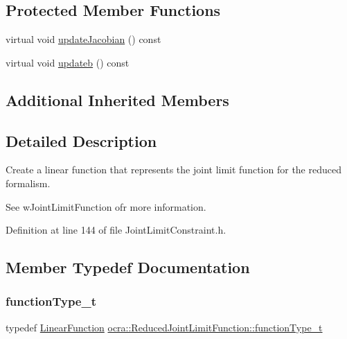\subsection*{Protected Member Functions}
\begin{DoxyCompactItemize}
\item 
virtual void \hyperlink{classocra_1_1ReducedJointLimitFunction_a3b2b65be504eda131ad8d00304304fd3}{update\+Jacobian} () const
\item 
virtual void \hyperlink{classocra_1_1ReducedJointLimitFunction_aaf30e3ac7c3053707a04a147b545126c}{updateb} () const
\end{DoxyCompactItemize}
\subsection*{Additional Inherited Members}


\subsection{Detailed Description}
Create a linear function that represents the joint limit function for the reduced formalism. 

See w\+Joint\+Limit\+Function ofr more information. 

Definition at line 144 of file Joint\+Limit\+Constraint.\+h.



\subsection{Member Typedef Documentation}
\hypertarget{classocra_1_1ReducedJointLimitFunction_a899e4871502f5e5509349b1f8eb5dfa8}{}\label{classocra_1_1ReducedJointLimitFunction_a899e4871502f5e5509349b1f8eb5dfa8} 
\subsubsection{\texorpdfstring{function\+Type\+\_\+t}{functionType\_t}}
{\footnotesize\ttfamily typedef \hyperlink{classocra_1_1LinearFunction}{Linear\+Function} \hyperlink{classocra_1_1ReducedJointLimitFunction_a899e4871502f5e5509349b1f8eb5dfa8}{ocra\+::\+Reduced\+Joint\+Limit\+Function\+::function\+Type\+\_\+t}}



